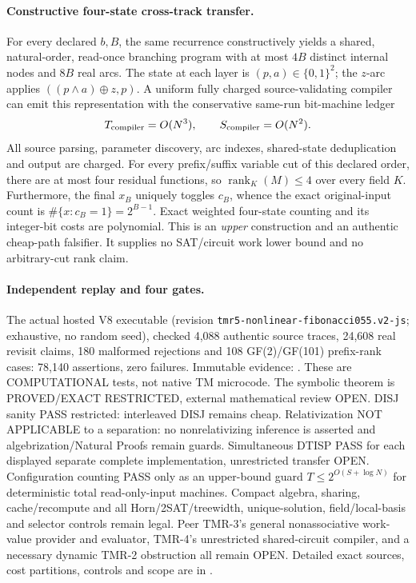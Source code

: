 \documentclass[11pt]{article}
\begin{document}
\paragraph{Constructive four-state cross-track transfer.}
For every declared $b,B$, the same recurrence
constructively yields a shared, natural-order,
read-once branching program with at most
$4B$ distinct internal nodes and $8B$ real arcs.
The state at each layer is $(p,a)\in\{0,1\}^2$;
the $z$-arc applies $((p\wedge a)\oplus z,p)$.
A uniform fully charged source-validating
compiler can emit this representation with the
conservative same-run bit-machine ledger
\[
T_{\rm compiler}=O(N^3),\qquad
S_{\rm compiler}=O(N^2).
\]
All source parsing, parameter discovery, arc indexes,
shared-state deduplication and output are charged.
For every prefix/suffix variable cut of this declared
order, there are at most four residual functions,
so $\operatorname{rank}_K(M)\le4$ over every field $K$.
Furthermore, the final $x_B$ uniquely toggles
$c_B$, whence the exact original-input count is
$\#\{x:c_B=1\}=2^{B-1}$. Exact weighted four-state
counting and its integer-bit costs are polynomial.
This is an \emph{upper} construction and an authentic
cheap-path falsifier. It supplies no SAT/circuit work
lower bound and no arbitrary-cut rank claim.

\paragraph{Independent replay and four gates.}
The actual hosted V8 executable
(revision \texttt{tmr5-nonlinear-fibonacci055.v2-js};
exhaustive, no random seed), checked 4,088 authentic
source traces, 24,608 real revisit claims, 180 malformed
rejections and 108 GF(2)/GF(101) prefix-rank cases:
78,140 assertions, zero failures. Immutable evidence:
.
These are COMPUTATIONAL tests, not native TM microcode.
The symbolic theorem is PROVED/EXACT RESTRICTED,
external mathematical review OPEN.
DISJ sanity PASS restricted: interleaved DISJ remains
cheap. Relativization NOT APPLICABLE to a separation:
no nonrelativizing inference is asserted and
algebrization/Natural Proofs remain guards.
Simultaneous DTISP PASS for each displayed separate
complete implementation, unrestricted transfer OPEN.
Configuration counting PASS only as an upper-bound
guard $T\le2^{O(S+\log N)}$ for deterministic total
read-only-input machines. Compact algebra, sharing,
cache/recompute and all Horn/2SAT/treewidth,
unique-solution, field/local-basis and selector
controls remain legal. Peer TMR-3's general
nonassociative work-value provider and evaluator,
TMR-4's unrestricted shared-circuit compiler, and
a necessary dynamic TMR-2 obstruction all remain OPEN.
Detailed exact sources, cost partitions, controls and
scope are in
.
\end{document}

